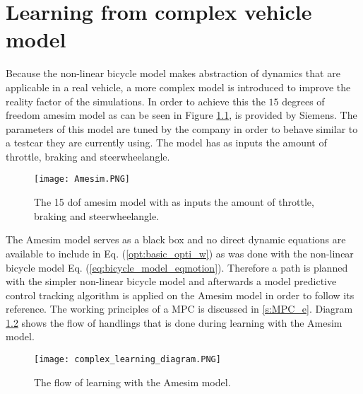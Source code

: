 \chapter{Learning from complex vehicle model}
\label{cha:Tracking_MPC}


Because the non-linear bicycle model makes abstraction of dynamics that are applicable in a real vehicle, a more complex model is introduced to improve the reality factor of the simulations. In order to achieve this the $15$ degrees of freedom amesim model as can be seen in Figure \ref{fig:Amesim}, is provided by Siemens. The parameters of this model are tuned by the company in order to behave similar to a testcar they are currently using. The model has as inputs the amount of throttle, braking and steerwheelangle.  

\begin{figure}[h!]
	\centering
	\texttt{[image: Amesim.PNG]}
	\caption{The 15 dof amesim model with as inputs the amount of throttle, braking and steerwheelangle.}	
	\label{fig:Amesim}
\end{figure}

The Amesim model serves as a black box and no direct dynamic equations are available 
to include in Eq. (\ref{opt:basic_opti_w}) as was done with the non-linear bicycle model Eq. (\ref{eq:bicycle_model_eqmotion}). Therefore a path is planned with the simpler non-linear bicycle model and afterwards a model predictive control tracking algorithm is applied on the Amesim model in order to follow its reference. The working principles of a MPC is discussed in \ref{s:MPC_e}. Diagram \ref{fig:complex_learning} shows the flow of handlings that is done during learning with the Amesim model.

\begin{figure}[h!]
	\centering
	\texttt{[image: complex\_learning\_diagram.PNG]}
	\caption{The flow of learning with the Amesim model.}	
	\label{fig:complex_learning} 
\end{figure}

